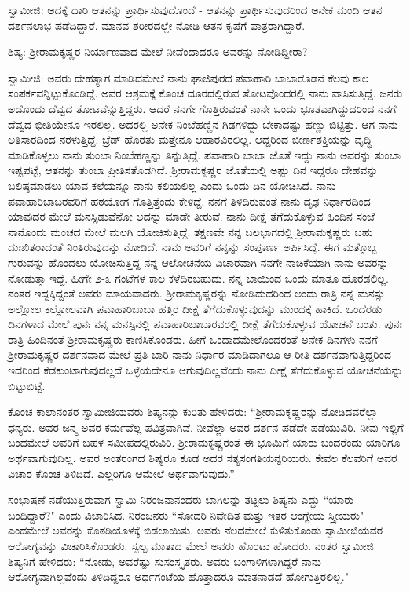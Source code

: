 ಸ್ವಾಮೀಜಿ: ಅದಕ್ಕೆ ದಾರಿ ಆತನನ್ನು ಪ್ರಾರ್ಥಿಸುವುದೊಂದೆ - ಆತನನ್ನು ಪ್ರಾರ್ಥಿಸುವುದರಿಂದ ಅನೇಕ ಮಂದಿ ಆತನ ದರ್ಶನಲಾಭ ಪಡೆದಿದ್ದಾರೆ. ಮಾನವ ಶರೀರದಲ್ಲೇ ನೋಡಿ ಆತನ ಕೃಪೆಗೆ ಪಾತ್ರರಾಗಿದ್ದಾರೆ.

ಶಿಷ್ಯ: ಶ‍್ರೀರಾಮಕೃಷ್ಣರ ನಿರ್ಯಾಣವಾದ ಮೇಲೆ ನೀವೆಂದಾದರೂ ಅವರನ್ನು ನೋಡಿದ್ದೀರಾ?

ಸ್ವಾಮೀಜಿ: ಅವರು ದೇಹತ್ಯಾಗ ಮಾಡಿದಮೇಲೆ ನಾನು ಘಾಜಿಪುರದ ಪವಾಹಾರಿ ಬಾಬಾರೊಡನೆ ಕೆಲವು ಕಾಲ ಸಂಪರ್ಕವನ್ನಿಟ್ಟುಕೊಂಡಿದ್ದೆ. ಅವರ ಆಶ್ರಮಕ್ಕೆ ಕೊಂಚ ದೂರದಲ್ಲಿರುವ ತೋಟವೊಂದರಲ್ಲಿ ನಾನು ವಾಸಿಸುತ್ತಿದ್ದೆ. ಜನರು ಅದೊಂದು ದೆವ್ವದ ತೋಟವೆನ್ನುತ್ತಿದ್ದರು. ಆದರೆ ನನಗೇ ಗೊತ್ತಿರುವಂತೆ ನಾನೇ ಒಂದು ಭೂತವಾಗಿದ್ದುದರಿಂದ ನನಗೆ ದೆವ್ವದ ಭೀತಿಯೇನೂ ಇರಲಿಲ್ಲ. ಅದರಲ್ಲಿ ಅನೇಕ ನಿಂಬೆಹಣ್ಣಿನ ಗಿಡಗಳಿದ್ದು ಬೇಕಾದಷ್ಟು ಹಣ್ಣು ಬಿಟ್ಟಿತ್ತು. ಆಗ ನಾನು ಅತಿಸಾರದಿಂದ ನರಳುತ್ತಿದ್ದೆ. ಬ್ರೆಡ್ ಹೊರತು ಮತ್ತೇನೂ ಆಹಾರವಿರಲಿಲ್ಲ. ಆದ್ದರಿಂದ ಜೀರ್ಣಶಕ್ತಿಯನ್ನು ವೃದ್ಧಿ ಮಾಡಿಕೊಳ್ಳಲು ನಾನು ತುಂಬಾ ನಿಂಬೆಹಣ್ಣನ್ನು ತಿನ್ನುತ್ತಿದ್ದೆ. ಪವಾಹಾರಿ ಬಾಬಾ ಜೊತೆ ಇದ್ದು ನಾನು ಅವರನ್ನು ತುಂಬಾ ಇಷ್ಟಪಟ್ಟೆ, ಆತನನ್ನು ತುಂಬಾ ಪ್ರೀತಿಸತೊಡಗಿದೆ. ಶ‍್ರೀರಾಮಕೃಷ್ಣರ ಜೊತೆಯಲ್ಲಿ ಅಷ್ಟು ದಿನ ಇದ್ದರೂ ದೇಹವನ್ನು ಬಲಿಷ್ಠಮಾಡಲು ಯಾವ ಕಲೆಯನ್ನೂ ನಾನು ಕಲಿಯಲಿಲ್ಲ ಎಂದು ಒಂದು ದಿನ ಯೋಚಿಸಿದೆ. ನಾನು ಪವಾಹಾರಿಬಾಬರವರಿಗೆ ಹಠಯೋಗ ಗೊತ್ತಿತ್ತೆಂದು ಕೇಳಿದ್ದೆ. ನನಗೆ ತಿಳಿದಿರುವಂತೆ ನಾನು ದೃಢ ನಿರ್ಧಾರದಿಂದ ಯಾವುದರ ಮೇಲೆ ಮನಸ್ಸಿಡುವೆನೋ ಅದನ್ನು ಮಾಡೇ ತೀರುವೆ. ನಾನು ದೀಕ್ಷೆ ತೆಗೆದುಕೊಳ್ಳುವ ಹಿಂದಿನ ಸಂಜೆ ನಾನೊಂದು ಮಂಚದ ಮೇಲೆ ಮಲಗಿ ಯೋಚಿಸುತ್ತಿದ್ದೆ. ತಕ್ಷಣವೇ ನನ್ನ ಬಲಭಾಗದಲ್ಲಿ ಶ‍್ರೀರಾಮಕೃಷ್ಣರು ಬಹು ದುಃಖಿತರಾದಂತೆ ನಿಂತಿರುವುದನ್ನು ನೋಡಿದೆ. ನಾನು ಅವರಿಗೆ ನನ್ನನ್ನು ಸಂಪೂರ್ಣ ಅರ್ಪಿಸಿದ್ದೆ. ಈಗ ಮತ್ತೊಬ್ಬ ಗುರುವನ್ನು ಹೊಂದಲು ಯೋಚಿಸುತ್ತಿದ್ದ ನನ್ನ ಆಲೋಚನೆಯ ವಿಚಾರವಾಗಿ ನನಗೇ ನಾಚಿಕೆಯಾಗಿ ನಾನು ಅವರನ್ನು ನೋಡುತ್ತಾ ಇದ್ದೆ. ಹೀಗೇ ೨-೩ ಗಂಟೆಗಳ ಕಾಲ ಕಳೆದಿರಬಹುದು. ನನ್ನ ಬಾಯಿಂದ ಒಂದು ಮಾತೂ ಹೊರಡಲಿಲ್ಲ. ನಂತರ ಇದ್ದಕ್ಕಿದ್ದಂತೆ ಅವರು ಮಾಯವಾದರು. ಶ‍್ರೀರಾಮಕೃಷ್ಣರನ್ನು ನೋಡಿದುದರಿಂದ ಅಂದು ರಾತ್ರಿ ನನ್ನ ಮನಸ್ಸು ಅಲ್ಲೋಲ ಕಲ್ಲೋಲವಾಗಿ ಪವಾಹಾರಿಬಾಬಾ ಹತ್ತಿರ ದೀಕ್ಷೆ ತೆಗೆದುಕೊಳ್ಳುವುದನ್ನು ಮುಂದಕ್ಕೆ ಹಾಕಿದೆ. ಒಂದೆರಡು ದಿನಗಳಾದ ಮೇಲೆ ಪುನಃ ನನ್ನ ಮನಸ್ಸಿನಲ್ಲಿ ಪವಾಹಾರಿಬಾಬಾರವರಲ್ಲಿ ದೀಕ್ಷೆ ತೆಗೆದುಕೊಳ್ಳುವ ಯೋಚನೆ ಬಂತು. ಪುನಃ ರಾತ್ರಿ ಹಿಂದಿನಂತೆ ಶ‍್ರೀರಾಮಕೃಷ್ಣರು ಕಾಣಿಸಿಕೊಂಡರು. ಹೀಗೆ ಒಂದಾದಮೇಲೊಂದರಂತೆ ಅನೇಕ ದಿನಗಳು ನನಗೆ ಶ‍್ರೀರಾಮಕೃಷ್ಣರ ದರ್ಶನವಾದ ಮೇಲೆ ಪ್ರತಿ ಬಾರಿ ನಾನು ನಿರ್ಧಾರ ಮಾಡಿದಾಗಲೂ ಆ ರೀತಿ ದರ್ಶನವಾಗುತ್ತಿದ್ದರಿಂದ ಇದರಿಂದ ಕೆಡಕುಂಟಾಗುವುದಲ್ಲದೆ ಒಳ್ಳೆಯದೇನೂ ಆಗುವುದಿಲ್ಲವೆಂದು ನಾನು ದೀಕ್ಷೆ ತೆಗೆದುಕೊಳ್ಳುವ ಯೋಚನೆಯನ್ನು ಬಿಟ್ಟುಬಿಟ್ಟೆ.

ಕೊಂಚ ಕಾಲಾನಂತರ ಸ್ವಾಮೀಜಿಯವರು ಶಿಷ್ಯನನ್ನು ಕುರಿತು ಹೇಳಿದರು: “ಶ‍್ರೀರಾಮಕೃಷ್ಣರನ್ನು ನೋಡಿದವರೆಲ್ಲಾ ಧನ್ಯರು. ಅವರ ಜನ್ಮ ಅವರ ಕರ್ಮವೆಲ್ಲ ಪವಿತ್ರವಾಗಿವೆ. ನೀವೆಲ್ಲಾ ಅವರ ದರ್ಶನ ಪಡೆದೇ ಪಡೆಯುವಿರಿ. ನೀವು ಇಲ್ಲಿಗೆ ಬಂದಮೇಲೆ ಅವರಿಗೆ ಬಹಳ ಸಮೀಪದಲ್ಲಿರುವಿರಿ. ಶ‍್ರೀರಾಮಕೃಷ್ಣರಂತೆ ಈ ಭೂಮಿಗೆ ಯಾರು ಬಂದರೆಂದು ಯಾರಿಗೂ ಅರ್ಥವಾಗುವುದಿಲ್ಲ. ಅವರ ಅಂತರಂಗದ ಶಿಷ್ಯರೂ ಕೂಡ ಅದರ ಸತ್ಯಸಂಗತಿಯನ್ನರಿಯರು. ಕೇವಲ ಕೆಲವರಿಗೆ ಅವರ ವಿಚಾರ ಕೊಂಚ ತಿಳಿದಿದೆ. ಎಲ್ಲರಿಗೂ ಆಮೇಲೆ ಅರ್ಥವಾಗುವುದು.”

ಸಂಭಾಷಣೆ ನಡೆಯುತ್ತಿರುವಾಗ ಸ್ವಾಮಿ ನಿರಂಜನಾನಂದರು ಬಾಗಿಲನ್ನು ತಟ್ಟಲು ಶಿಷ್ಯನು ಎದ್ದು “ಯಾರು ಬಂದಿದ್ದಾರೆ?" ಎಂದು ವಿಚಾರಿಸಿದ. ನಿರಂಜನರು “ಸೋದರಿ ನಿವೇದಿತ ಮತ್ತು ಇತರ ಆಂಗ್ಲೇಯ ಸ್ತ್ರೀಯರು" ಎಂದಮೇಲೆ ಅವರನ್ನು ಕೊಠಡಿಯೊಳಕ್ಕೆ ಬಿಡಲಾಯಿತು. ಅವರು ನೆಲದಮೇಲೆ ಕುಳಿತುಕೊಂಡು ಸ್ವಾಮೀಜಿಯವರ ಆರೋಗ್ಯವನ್ನು ವಿಚಾರಿಸಿಕೊಂಡರು. ಸ್ವಲ್ಪ ಮಾತಾದ ಮೇಲೆ ಅವರು ಹೊರಟು ಹೋದರು. ನಂತರ ಸ್ವಾಮೀಜಿ ಶಿಷ್ಯನಿಗೆ ಹೇಳಿದರು: “ನೋಡು, ಅವರೆಷ್ಟು ಸುಸಂಸ್ಕೃತರು. ಅವರು ಬಂಗಾಳಿಗಳಾಗಿದ್ದರೆ ನಾನು ಆರೋಗ್ಯವಾಗಿಲ್ಲವೆಂದು ತಿಳಿದಿದ್ದರೂ ಅರ್ಧಗಂಟೆಯ ಹೊತ್ತಾದರೂ ಮಾತನಾಡದೆ ಹೋಗುತ್ತಿರಲಿಲ್ಲ."

